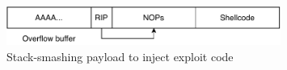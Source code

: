 \begin{figure}[htp!]
    \centering
    \includegraphics[width=0.8\textwidth]{assets/figures/chapter3/stack-smashing-payload.pdf}
    \caption{Stack-smashing payload to inject exploit code}
    \label{fig:stack-smashing-payload}
\end{figure}
